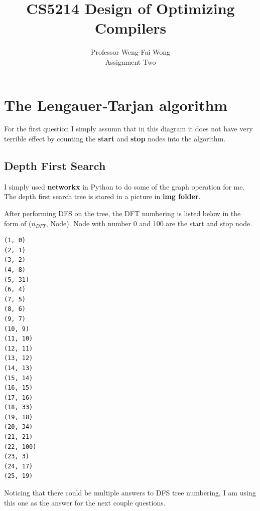 \documentclass[12pt]{article}
\begin{document}


\title{CS5214 Design of Optimizing Compilers }%
\author{Professor Weng-Fai Wong\\ %
Assignment Two} %

\maketitle

\section{The Lengauer‐Tarjan algorithm}

For the first question I simply assumn that in this diagram it does
not have very terrible effect by counting the {\bf start} and {\bf
  stop} nodes into the algorithm.

\subsection{Depth First Search}
I simply used {\bf networkx} in Python to do some of the graph
operation for me. The depth first search tree is stored in a picture
in {\bf img folder}.

After performing DFS on the tree, the DFT numbering is listed below in
the form of ($n_{DFT}$, Node). Node with number 0 and 100 are the
start and stop node.

\begin{verbatim}
(1, 0)
(2, 1)
(3, 2)
(4, 8)
(5, 31)
(6, 4)
(7, 5)
(8, 6)
(9, 7)
(10, 9)
(11, 10)
(12, 11)
(13, 12)
(14, 13)
(15, 14)
(16, 15)
(17, 16)
(18, 33)
(19, 18)
(20, 34)
(21, 21)
(22, 100)
(23, 3)
(24, 17)
(25, 19)
\end{verbatim}
Noticing that there could be multiple answers to DFS tree numbering, I
am using this one as the answer for the next couple questions.
\end{document}

